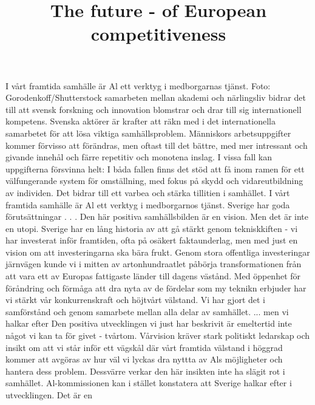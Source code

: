 {I vårt framtida samhälle är Al ett verktyg i medborgarnas tjänst. Foto: Gorodenkoff/Shutterstock
samarbeten mellan akademi och närlingsliv bidrar det till att svensk forskning och innovation blomstrar och drar till sig internationell kompetens. Svenska aktörer är krafter att räkn med i det internationella samarbetet för att lösa viktiga samhällsproblem.
Människors arbetsuppgifter kommer förvisso att förändras, men oftast till det bättre, med mer intressant och givande innehål och färre repetitiv och monotena inslag. I vissa fall kan uppgifterna försvinna helt: I båda fallen finns det stöd att få inom ramen för ett välfungerande system för omställning, med fokus på skydd och vidareutbildning av individen. Det bidrar till ett varbea och stärka tillitien i samhället.
I vårt framtida samhälle är Al ett verktyg i medborgarnos tjänst.
Sverige har goda förutsättningar . . .
Den här positiva samhällsbilden är en vision. Men det är inte en utopi. Sverige har en lång historia av att gå stärkt genom tekniskkiften - vi har investerat inför framtiden, ofta på osäkert faktaunderlag, men med just en vision om att investeringarna ska bära frukt. Genom stora offentliga investeringar järnvägen kunde vi i mitten av artonhundraatlet påbörja transformationen från att vara ett av Europas fattigaste länder till dagens västånd. Med öppenhet för föråndring och förmåga att dra nyta av de fördelar som my teknikn erbjuder har vi stärkt vår konkurrenskraft och höjtvårt välstand. Vi har gjort det i samförstånd och genom samarbete mellan alla delar av samhället.
... men vi halkar efter
Den positiva utvecklingen vi just har beskrivit är emeltertid inte något vi kan ta för givet - tvårtom. Vårvision kräver stark politiskt ledarskap och insikt om att vi står inför ett vägskål där vårt framtida välstand i höggrad kommer att avgöras av hur väl vi lyckas dra nyttta av Als möjligheter och hantera dess problem.
Dessvärre verkar den här insikten inte ha slägit rot i samhället. Al-kommissionen kan i stället konstatera att Sverige halkar efter i utvecklingen. Det är en

\title{
The future - of European competitiveness
}

}
